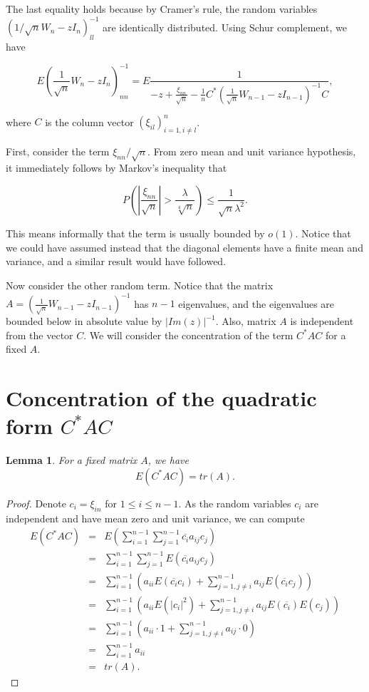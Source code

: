\documentclass[12pt,a4paper,leqno]{report}
\theoremstyle{plain}
\newtheorem{lem}[equation]{Lemma}
\theoremstyle{definition}
\theoremstyle{remark}
\begin{document}
The last equality holds because by Cramer's rule, the random variables $(1/\sqrt{n} W_n - z I_n)^{-1}_{ll}$ are identically distributed.
Using Schur complement, we have

\begin{equation*}
E(\frac{1}{\sqrt{n}}W_n - z I_n)^{-1}_{nn} = E\frac{1}{-z+\frac{\xi_{nn}}{\sqrt{n}}-\frac{1}{n}C^* (\frac{1}{\sqrt{n}}W_{n-1}-zI_{n-1})^{-1}C},
\end{equation*}

where $C$ is the column vector $(\xi_{il})_{i=1, i\neq l}^{n}$.

First, consider the term $\xi_{nn}/\sqrt{n}$. From zero mean and unit variance hypothesis, it immediately follows by Markov's inequality that

\begin{equation*}
P(|\frac{\xi_{nn}}{\sqrt{n}}|>\frac{\lambda}{\sqrt[4]{n}}) \leq \frac{1}{\sqrt{n}\lambda^2}. 
\end{equation*}

This means informally that the term is usually bounded by $o(1)$. Notice that we could have assumed instead that the diagonal elements have a finite mean and variance, and a similar result would have followed.

Now consider the other random term. Notice that the matrix $A = (\frac{1}{\sqrt{n}}W_{n-1}-zI_{n-1})^{-1}$ has $n-1$ eigenvalues, and the eigenvalues are bounded below in absolute value by $|Im(z)|^{-1}$. Also, matrix $A$ is independent from the vector $C$. We will consider the concentration of the term $C^* A C$ for a fixed $A$.

\section{Concentration of the quadratic form $C^* A C$}

\begin{lem}
For a fixed matrix $A$, we have
\begin{equation*}
E(C^* A C) = tr(A).
\end{equation*}
\end{lem}

\begin{proof}
Denote $c_i = \xi_{in}$ for $1 \leq i \leq n-1$.
As the random variables $c_i$ are independent and have mean zero and unit variance, we can compute
\begin{eqnarray*}
E(C^* A C) & = & E(\sum_{i=1}^{n-1} \sum_{j=1}^{n-1} \overline{c_i} a_{ij} c_j)\\
& = & \sum_{i=1}^{n-1} \sum_{j=1}^{n-1} E(\overline{c_i} a_{ij} c_j)\\
& = & \sum_{i=1}^{n-1} (a_{ii} E(\overline{c_i}c_i) + \sum_{j=1,j \neq i}^{n-1} a_{ij} E(\overline{c_i} c_j))\\
& = & \sum_{i=1}^{n-1} (a_{ii} E(|c_i|^2 ) + \sum_{j=1,j \neq i}^{n-1} a_{ij} E(\overline{c_i}) E(c_j))\\
& = & \sum_{i=1}^{n-1} (a_{ii} \cdot 1 + \sum_{j=1,j \neq i}^{n-1} a_{ij} \cdot 0)\\
& = & \sum_{i=1}^{n-1} a_{ii}\\
& = & tr(A).
\end{eqnarray*} 
\end{proof}
\end{document}
